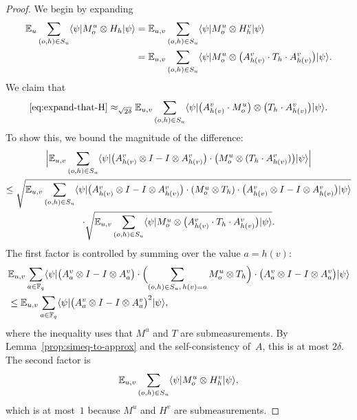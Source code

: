 \begin{proof}
  \leanok
  We begin by expanding
  \begin{align}
    \mathbb{E}_{u} \sum_{(o, h) \in S_{u}} \langle \psi \rvert M^{u}_o \otimes H_h \lvert \psi \rangle
    &= \mathbb{E}_{u,v} \sum_{(o, h) \in S_{u}} \langle \psi \rvert M^{u}_o \otimes H^{v}_h \lvert \psi \rangle \notag\\
    &= \mathbb{E}_{u,v} \sum_{(o, h) \in S_{u}} \langle \psi \rvert M^{u}_o \otimes \bigl(A^{v}_{h(v)} \cdot T_h \cdot A^{v}_{h(v)}\bigr) \lvert \psi \rangle. \label{eq:expand-that-H}
  \end{align}
  We claim that
  \begin{equation}\label{eq:move-first-point-projector}
    \eqref{eq:expand-that-H}
    \approx_{\sqrt{2\delta}}
    \mathbb{E}_{u,v} \sum_{(o, h) \in S_{u}} \langle \psi \rvert \bigl(A^{v}_{h(v)} \cdot M^{u}_o\bigr) \otimes \bigl(T_h \cdot A^{v}_{h(v)}\bigr) \lvert \psi \rangle.
  \end{equation}
  To show this, we bound the magnitude of the difference:
  \begin{multline}
    \Big|\mathbb{E}_{u,v} \sum_{(o, h) \in S_{u}} \langle \psi \rvert \bigl(A^{v}_{h(v)} \otimes I - I \otimes A^{v}_{h(v)}\bigr) \cdot \bigl(M^{u}_o \otimes (T_h \cdot A^{v}_{h(v)})\bigr)\lvert \psi \rangle\Big|\\
    \leq
    \sqrt{\mathbb{E}_{u,v} \sum_{(o, h) \in S_{u}} \langle \psi \rvert \bigl(A^{v}_{h(v)} \otimes I - I \otimes A^{v}_{h(v)}\bigr) \cdot (M^{u}_o \otimes T_h) \cdot \bigl(A^{v}_{h(v)} \otimes I - I \otimes A^{v}_{h(v)}\bigr) \lvert \psi \rangle}\\
    \cdot \sqrt{\mathbb{E}_{u,v} \sum_{(o, h) \in S_{u}} \langle \psi \rvert  M^{u}_o \otimes \bigl(A^{v}_{h(v)} \cdot T_h\cdot  A^{v}_{h(v)}\bigr) \lvert \psi \rangle}. \label{eq:move-first-point-projector-cauchy-schwarz}
  \end{multline}
  The first factor is controlled by summing over the value $a = h(v)$:
  \begin{align*}
    &\mathbb{E}_{u,v} \sum_{a \in \mathbb{F}_q} \langle \psi \rvert \bigl(A^v_a \otimes I - I \otimes A^v_a\bigr)
      \cdot \Bigl(\sum_{(o,h)\in S_u,\, h(v)=a} M^u_o \otimes T_h\Bigr)
      \cdot \bigl(A^v_a \otimes I - I \otimes A^v_a\bigr)\lvert \psi \rangle \\
    &\le \mathbb{E}_{u,v} \sum_{a \in \mathbb{F}_q} \langle \psi \rvert \bigl(A^v_a \otimes I - I \otimes A^v_a\bigr)^2
      \lvert \psi \rangle,
  \end{align*}
  where the inequality uses that $M^u$ and $T$ are submeasurements. By
  Lemma~\ref{prop:simeq-to-approx} and the self-consistency of~$A$, this is at most
  $2\delta$. The second factor is
  \[
    \mathbb{E}_{u,v} \sum_{(o,h)\in S_u} \langle \psi \rvert M^u_o \otimes H^v_h \lvert \psi \rangle,
  \]
  which is at most~$1$ because $M^u$ and $H^v$ are submeasurements.


\end{proof}
